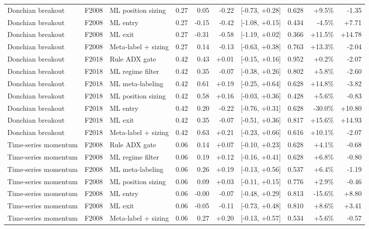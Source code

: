 \begin{longtable}{p{2.4cm} l p{2.5cm} r r r l r r r}
Donchian breakout & F2008 & ML position sizing & 0.27 & 0.05 & -0.22 & [-0.73, +0.28] & 0.628 & +9.5\% & -1.35 \\
Donchian breakout & F2008 & ML entry & 0.27 & -0.15 & -0.42 & [-1.08, +0.15] & 0.434 & -4.5\% & +7.71 \\
Donchian breakout & F2008 & ML exit & 0.27 & -0.31 & -0.58 & [-1.19, +0.02] & 0.366 & +11.5\% & +14.78 \\
Donchian breakout & F2008 & Meta-label + sizing & 0.27 & 0.14 & -0.13 & [-0.63, +0.38] & 0.763 & +13.3\% & -2.04 \\
Donchian breakout & F2018 & Rule ADX gate & 0.42 & 0.43 & +0.01 & [-0.15, +0.16] & 0.952 & +0.2\% & -2.07 \\
Donchian breakout & F2018 & ML regime filter & 0.42 & 0.35 & -0.07 & [-0.38, +0.26] & 0.802 & +5.8\% & -2.60 \\
Donchian breakout & F2018 & ML meta-labeling & 0.42 & 0.61 & +0.19 & [-0.25, +0.64] & 0.628 & +14.8\% & -3.82 \\
Donchian breakout & F2018 & ML position sizing & 0.42 & 0.58 & +0.16 & [-0.03, +0.36] & 0.428 & +5.6\% & -0.83 \\
Donchian breakout & F2018 & ML entry & 0.42 & 0.20 & -0.22 & [-0.76, +0.31] & 0.628 & -30.0\% & +10.80 \\
Donchian breakout & F2018 & ML exit & 0.42 & 0.35 & -0.07 & [-0.51, +0.36] & 0.817 & +15.6\% & +14.93 \\
Donchian breakout & F2018 & Meta-label + sizing & 0.42 & 0.63 & +0.21 & [-0.23, +0.66] & 0.616 & +10.1\% & -2.07 \\
Time-series momentum & F2008 & Rule ADX gate & 0.06 & 0.14 & +0.07 & [-0.10, +0.23] & 0.628 & +4.1\% & -0.68 \\
Time-series momentum & F2008 & ML regime filter & 0.06 & 0.19 & +0.12 & [-0.16, +0.41] & 0.628 & +6.8\% & -0.80 \\
Time-series momentum & F2008 & ML meta-labeling & 0.06 & 0.26 & +0.19 & [-0.13, +0.56] & 0.537 & +6.4\% & -1.19 \\
Time-series momentum & F2008 & ML position sizing & 0.06 & 0.09 & +0.03 & [-0.11, +0.15] & 0.776 & +2.9\% & -0.46 \\
Time-series momentum & F2008 & ML entry & 0.06 & -0.00 & -0.07 & [-0.48, +0.29] & 0.813 & -15.6\% & +8.80 \\
Time-series momentum & F2008 & ML exit & 0.06 & -0.05 & -0.11 & [-0.73, +0.48] & 0.810 & +8.6\% & +3.41 \\
Time-series momentum & F2008 & Meta-label + sizing & 0.06 & 0.27 & +0.20 & [-0.13, +0.57] & 0.534 & +5.6\% & -0.57 \\

\end{longtable}
